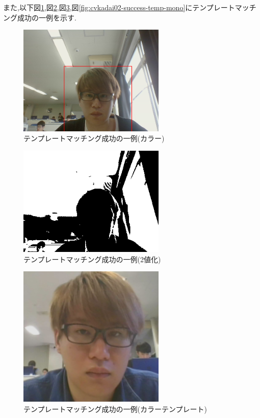 \documentclass{jarticle}
\begin{document}
また,以下図\ref{fig:cvkadai02-success-color},図\ref{fig:cvkadai02-success-mono},図\ref{fig:cvkadai02-success-temp-color},図\ref{fig:cvkadai02-success-temp-mono}にテンプレートマッチング成功の一例を示す.


\begin{figure}[H]
\begin{center}
\includegraphics[width=7.0cm]{cv_kadai02/success-color.png}
\caption{テンプレートマッチング成功の一例(カラー)}
\label{fig:cvkadai02-success-color}
\end{center}
\end{figure}

\begin{figure}[H]
\begin{center}
\includegraphics[width=7.0cm]{cv_kadai02/success-mono.png}
\caption{テンプレートマッチング成功の一例(2値化)}
\label{fig:cvkadai02-success-mono}
\end{center}
\end{figure}

\begin{figure}[H]
\begin{center}
\includegraphics[width=7.0cm]{cv_kadai02/success-temp-color.png}
\caption{テンプレートマッチング成功の一例(カラーテンプレート)}
\label{fig:cvkadai02-success-temp-color}
\end{center}
\end{figure}
\end{document}
